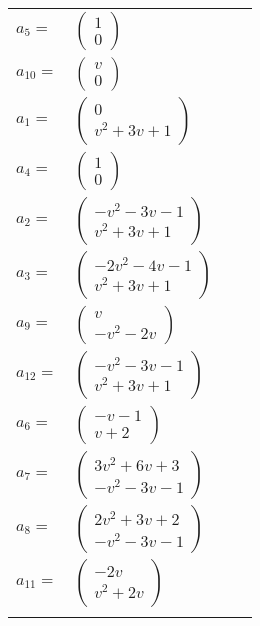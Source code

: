 \documentclass[1p]{elsarticle_modified}
\theoremstyle{definition}
\begin{document}
\begin{tabular}{m{7pt} m{180pt} m{7pt} m{180pt} }
\flushright $a_{5}=$&$\begin{pmatrix}1\\0\end{pmatrix}$ \\
\flushright $a_{10}=$&$\begin{pmatrix}v\\0\end{pmatrix}$ \\
\flushright $a_{1}=$&$\begin{pmatrix}0\\v^2+3 v+1\end{pmatrix}$ \\
\flushright $a_{4}=$&$\begin{pmatrix}1\\0\end{pmatrix}$ \\
\flushright $a_{2}=$&$\begin{pmatrix}- v^2-3 v-1\\v^2+3 v+1\end{pmatrix}$ \\
\flushright $a_{3}=$&$\begin{pmatrix}-2 v^2-4 v-1\\v^2+3 v+1\end{pmatrix}$ \\
\flushright $a_{9}=$&$\begin{pmatrix}v\\- v^2-2 v\end{pmatrix}$ \\
\flushright $a_{12}=$&$\begin{pmatrix}- v^2-3 v-1\\v^2+3 v+1\end{pmatrix}$ \\
\flushright $a_{6}=$&$\begin{pmatrix}- v-1\\v+2\end{pmatrix}$ \\
\flushright $a_{7}=$&$\begin{pmatrix}3 v^2+6 v+3\\- v^2-3 v-1\end{pmatrix}$ \\
\flushright $a_{8}=$&$\begin{pmatrix}2 v^2+3 v+2\\- v^2-3 v-1\end{pmatrix}$ \\
\flushright $a_{11}=$&$\begin{pmatrix}-2 v\\v^2+2 v\end{pmatrix}$\\&\end{tabular}
\end{document}
